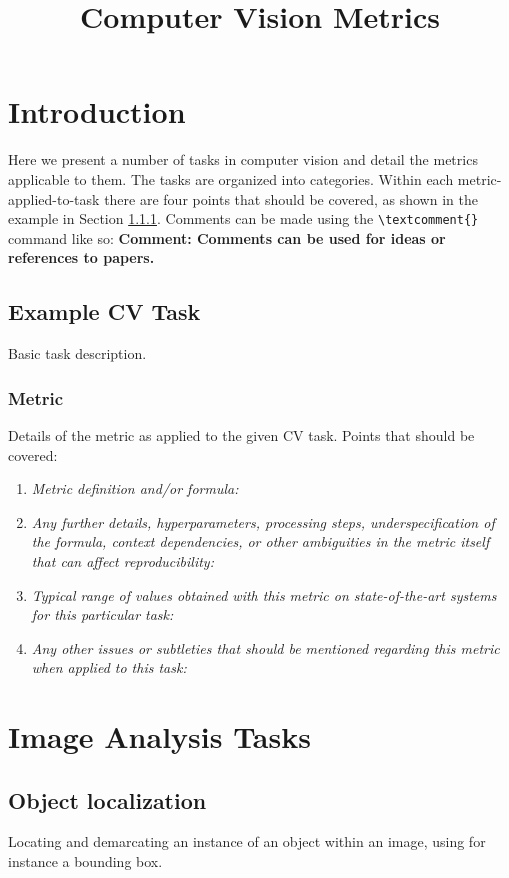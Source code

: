 \documentclass[a4paper,11pt]{article}
\title{Computer Vision Metrics}
\author{}
\date{}
\newcommand{\textcomment}[1]{{{\bf \color{Aquamarine} Comment: #1}}}
\begin{document}
\maketitle

\section{Introduction}
Here we present a number of tasks in computer vision and detail the metrics applicable to them. The tasks are organized into categories. Within each metric-applied-to-task there are four points that should be covered, as shown in the example in Section \ref{example_metric_applied_to_task}. Comments can be made using the \verb+\textcomment{}+ command like so: \textcomment{Comments can be used for ideas or references to papers.}

\subsection{Example CV Task} \label{example_cv_task}
    Basic task description.
    \subsubsection{Metric} \label{example_metric_applied_to_task}
    Details of the metric as applied to the given CV task. Points that should be covered:
    \begin{enumerate}[label=\alph*.]
        \item \textit{Metric definition and/or formula:}
            \bigskip
            \item \textit{Any further details, hyperparameters, processing steps, underspecification of the formula, context dependencies, or other ambiguities in the metric itself that can affect reproducibility:}
            \bigskip
            \item \textit{Typical range of values obtained with this metric on state-of-the-art systems for this particular task:}
            \bigskip
            \item \textit{Any other issues or subtleties that should be mentioned regarding this metric when applied to this task:}
            \bigskip
    \end{enumerate}


\clearpage
\section{Image Analysis Tasks}
    \subsection{Object localization} \label{object_localization}
    Locating and demarcating an instance of an object within an image, using for instance a bounding box.
\end{document}
